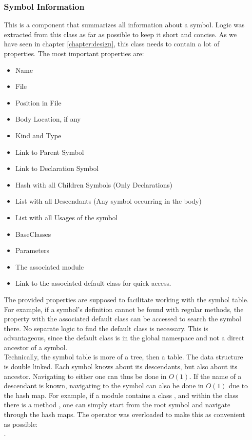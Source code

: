 \subsubsection{Symbol Information}
This is a component that summarizes all information about a symbol.
Logic was extracted from this class as far as possible to keep it short and concise.
As we have seen in chapter \ref{chapter:design}, this class needs to contain a lot of properties.
The most important properties are:
\begin{itemize}
    \item Name
    \item File
    \item Position in File
    \item Body Location, if any
    \item Kind and Type
    \item Link to Parent Symbol
    \item Link to Declaration Symbol
    \item Hash with all Children Symbols (Only Declarations)
    \item List with all Descendants (Any symbol occurring in the body)
    \item List with all Usages of the symbol
    \item BaseClasses
    \item Parameters
    \item The associated module
    \item Link to the associated default class for quick access.
\end{itemize}

The provided properties are supposed to facilitate working with the symbol table.
For example, if a symbol's definition cannot be found with regular methods, the property with the associated default class can be accessed to search the symbol there.
No separate logic to find the default class is necessary.
This is advantageous, since the default class is in the global namespace and not a direct ancestor of a symbol.\\

Technically, the symbol table is more of a tree, then a table.
The data structure is double linked.
Each symbol knows about its descendants, but also about its ancestor.
Navigating to either one can thus be done in $O(1)$.
If the name of a descendant is known, navigating to the symbol can also be done in $O(1)$ due to the hash map.
For example, if a module  contains a class , and within the class there is a method , one can simply start from the root symbol and navigate through the hash maps.
The \code{[]} operator was overloaded to make this as convenient as possible:\\
.\\

